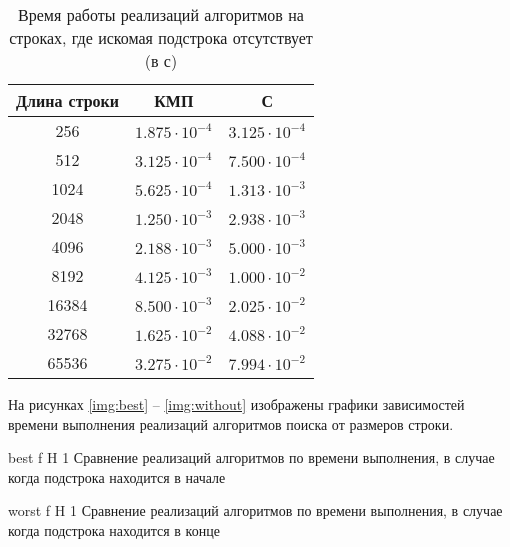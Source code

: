 \begin{table}[H]
	\begin{center}
		\begin{threeparttable}
			\captionsetup{justification=raggedright,singlelinecheck=off}
			\caption{Время работы реализаций алгоритмов  на строках, где искомая подстрока отсутствует (в с)}
			\label{tbl:time_measurements_2}
			\begin{tabular}{|c|c|c|}
				\hline
				Длина строки &  КМП  & С \\
				\hline
				256 &$ 1.875\cdot 10^{-4} $&$ 3.125\cdot 10^{-4}$\\
				\hline
				512 &$ 3.125\cdot 10^{-4} $&$ 7.500\cdot 10^{-4}$\\
				\hline
				1024 &$ 5.625\cdot 10^{-4} $&$ 1.313\cdot 10^{-3}$\\
				\hline
				2048 &$ 1.250\cdot 10^{-3} $&$ 2.938\cdot 10^{-3}$\\
				\hline
				4096 &$ 2.188\cdot 10^{-3} $&$ 5.000\cdot 10^{-3}$\\
				\hline
				8192 &$ 4.125\cdot 10^{-3} $&$ 1.000\cdot 10^{-2}$\\
				\hline
				16384 &$ 8.500\cdot 10^{-3} $&$ 2.025\cdot 10^{-2}$\\
				\hline
				32768 &$ 1.625\cdot 10^{-2} $&$ 4.088\cdot 10^{-2}$\\
				\hline
				65536 &$ 3.275\cdot 10^{-2} $&$ 7.994\cdot 10^{-2}$\\
				\hline
				
			\end{tabular}
		\end{threeparttable}
	\end{center}
\end{table}

На рисунках \ref{img:best} -- \ref{img:without} изображены графики зависимостей времени выполнения реализаций алгоритмов поиска от размеров строки.

{best} %
{f} %
{H} %
{1\textwidth} %
{Сравнение реализаций алгоритмов по времени выполнения, в случае когда подстрока находится в начале} %

{worst} %
{f} %
{H} %
{1\textwidth} %
{Сравнение реализаций алгоритмов по времени выполнения, в случае когда подстрока находится в конце} %


